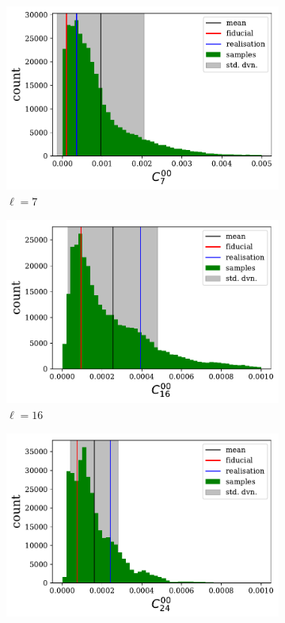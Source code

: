 \begin{figure}
\begin{subfigure}{.5\textwidth}
  \centering
  \includegraphics[scale=0.50]{BPL-FIGS/Euclid-foot-LN-PoiNoi-N32-HISTOGRAM-ell-07.pdf}
  \caption{$\ell = 7$}
\end{subfigure}
\begin{subfigure}{.5\textwidth}
  \centering
  \includegraphics[scale=0.50]{BPL-FIGS/Euclid-foot-LN-PoiNoi-N32-HISTOGRAM-ell-16.pdf}
  \caption{$\ell = 16$}
\end{subfigure}
\begin{subfigure}{.5\textwidth}
  \centering
  \includegraphics[scale=0.50]{BPL-FIGS/Euclid-foot-LN-PoiNoi-N32-HISTOGRAM-ell-24.pdf}

\end{subfigure}
\end{figure}
